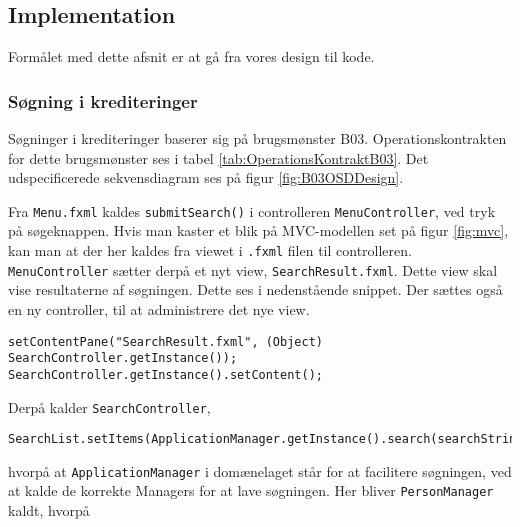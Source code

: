 \subsection{Implementation}

Formålet med dette afsnit er at gå fra vores design til kode.

\subsubsection{Søgning i krediteringer}%
\label{ssub:sogning_i_krediteringer}

Søgninger i krediteringer baserer sig på brugsmønster B03. Operationskontrakten
for dette brugsmønster ses i tabel \ref{tab:OperationsKontraktB03}. Det
udspecificerede sekvensdiagram ses på figur \ref{fig:B03OSDDesign}.

Fra \texttt{Menu.fxml} kaldes \texttt{submitSearch()} i controlleren
\texttt{MenuController}, ved tryk på søgeknappen. Hvis man kaster et blik på
MVC-modellen set på figur \ref{fig:mvc}, kan man at der her kaldes fra viewet i
\texttt{.fxml} filen til controlleren. \texttt{MenuController} sætter derpå et
nyt view, \texttt{SearchResult.fxml}. Dette view skal vise resultaterne af
søgningen. Dette ses i nedenstående snippet. Der sættes også en ny controller,
til at administrere det nye view.

\begin{lstlisting}
setContentPane("SearchResult.fxml", (Object) SearchController.getInstance());
SearchController.getInstance().setContent();
\end{lstlisting}

Derpå kalder \texttt{SearchController},

\begin{lstlisting}
SearchList.setItems(ApplicationManager.getInstance().search(searchString));
\end{lstlisting}

hvorpå at \texttt{ApplicationManager} i domænelaget står for at facilitere
søgningen, ved at kalde de korrekte Managers for at lave søgningen. Her bliver
\texttt{PersonManager} kaldt, hvorpå 

